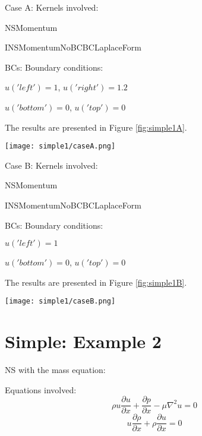 \documentclass[11pt,letterpaper]{article}
\begin{document}
Case A:
Kernels involved:
\begin{description}[font=$\bullet$\scshape\bfseries]
	\item[] NSMomentum
	\item[] INSMomentumNoBCBCLaplaceForm
\end{description} 

BCs:
Boundary conditions:
\begin{description}[]
	\item[] $u('left')=1$, $u('right')=1.2$
	\item[] $u('bottom')=0$, $u('top')=0$
\end{description}

The results are presented in Figure \ref{fig:simple1A}.
\begin{figure*}[!h]
	\centering
	\texttt{[image: simple1/caseA.png]}
	\hfill
	\caption{u.}
	\label{fig:simple1A}
\end{figure*}

Case B:
Kernels involved:
\begin{description}[font=$\bullet$\scshape\bfseries]
	\item[] NSMomentum
	\item[] INSMomentumNoBCBCLaplaceForm
\end{description} 

BCs:
Boundary conditions:
\begin{description}[]
	\item[] $u('left')=1$
	\item[] $u('bottom')=0$, $u('top')=0$
\end{description}

The results are presented in Figure \ref{fig:simple1B}.
\begin{figure*}[!h]
	\centering
	\texttt{[image: simple1/caseB.png]}
	\hfill
	\caption{u.}
	\label{fig:simple1B}
\end{figure*}

\section{Simple: Example 2}

NS with the mass equation:

Equations involved:
\begin{equation}
\rho u\frac{\partial u}{\partial x} + \frac{\partial p}{\partial x} - \mu \nabla^{2}u = 0
\end{equation}
\begin{equation}
u \frac{\partial \rho}{\partial x} + \rho \frac{\partial u}{\partial x}=0
\end{equation}
\end{document}
